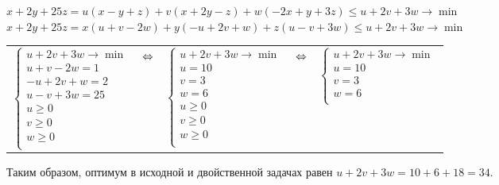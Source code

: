 \documentclass{article}
\begin{document}
	\begin{center}
		$x+2y+25z = u(x-y+z) + v(x+2y-z) + w(-2x+y+3z) \leq u + 2v + 3w \rightarrow \min$ \\ 
		$x+2y+25z = x(u+v-2w) + y(-u+2v+w) + z(u-v+3w) \leq u + 2v + 3w \rightarrow \min$ \\
		
		\begin{tabular}{ccccc}
			$\begin{cases}
			u + 2v + 3w \rightarrow\min  \\
			u+v-2w = 1\\
			-u+2v+w = 2 \\
			u-v+3w = 25 \\
			u \geq 0 \\
			v \geq 0 \\
			w \geq 0 \\
			\end{cases}$ 
			& $\hfill \Leftrightarrow \hfill$ &
			$\begin{cases}
			u + 2v + 3w \rightarrow\min  \\
			u = 10 \\
			v = 3 \\
			w = 6 \\
			u \geq 0 \\
			v \geq 0 \\
			w \geq 0 \\
			\end{cases}$ 
			& $\hfill \Leftrightarrow \hfill$ &
			$\begin{cases}
			u + 2v + 3w \rightarrow\min  \\
			u = 10 \\
			v = 3 \\
			w = 6 \\
			\end{cases}$ 
		\end{tabular}
	\end{center}
	Таким образом, оптимум в исходной и двойственной задачах равен 
	$u + 2v + 3w = 10 + 6 + 18 = 34$.
	
	
	
\end{document}
